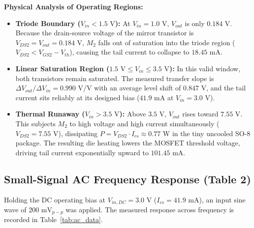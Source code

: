 \documentclass[11pt, a4paper]{article}
\begin{document}
\noindent\textbf{Physical Analysis of Operating Regions:}
\begin{itemize}
    \item \textbf{Triode Boundary ($V_{in} < 1.5\text{ V}$):} At $V_{in} = 1.0\text{ V}$, $V_{out}$ is only $0.184\text{ V}$. Because the drain-source voltage of the mirror transistor is $V_{DS2} = V_{out} = 0.184\text{ V}$, $M_2$ falls out of saturation into the triode region ($V_{DS2} < V_{GS2} - V_{th}$), causing the tail current to collapse to $18.45\text{ mA}$.
    \item \textbf{Linear Saturation Region ($1.5\text{ V} \le V_{in} \le 3.5\text{ V}$):} In this valid window, both transistors remain saturated. The measured transfer slope is $\Delta V_{out} / \Delta V_{in} = 0.990\text{ V/V}$ with an average level shift of $0.847\text{ V}$, and the tail current sits reliably at its designed bias ($41.9\text{ mA}$ at $V_{in} = 3.0\text{ V}$).
    \item \textbf{Thermal Runaway ($V_{in} > 3.5\text{ V}$):} Above $3.5\text{ V}$, $V_{out}$ rises toward $7.55\text{ V}$. This subjects $M_2$ to high voltage and high current simultaneously ($V_{DS2} = 7.55\text{ V}$), dissipating $P = V_{DS2} \cdot I_{cs} \approx 0.77\text{ W}$ in the tiny uncooled SO-8 package. The resulting die heating lowers the MOSFET threshold voltage, driving tail current exponentially upward to $101.45\text{ mA}$.
\end{itemize}

\subsection{Small-Signal AC Frequency Response (Table 2)}
Holding the DC operating bias at $V_{in,DC} = 3.0\text{ V}$ ($I_{cs} = 41.9\text{ mA}$), an input sine wave of $200\text{ mV}_{p-p}$ was applied. The measured response across frequency is recorded in Table~\ref{tab:ac_data}.
\end{document}
